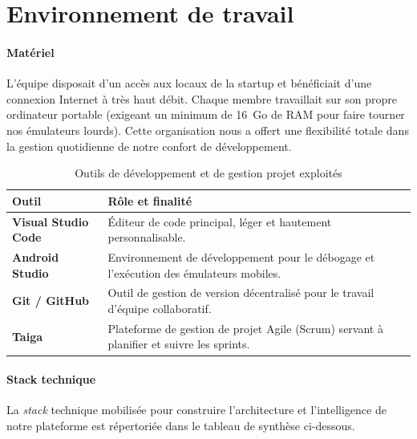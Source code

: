 \section{Environnement de travail}

\paragraph*{Matériel}
L'équipe disposait d'un accès aux locaux de la startup et bénéficiait d'une connexion Internet à très haut débit. Chaque membre travaillait sur son propre ordinateur portable (exigeant un minimum de 16~Go de RAM pour faire tourner nos émulateurs lourds). Cette organisation nous a offert une flexibilité totale dans la gestion quotidienne de notre confort de développement.

\begin{table}[H]
    \centering
    \small
    \renewcommand{\arraystretch}{1.5}
    \begin{tabular}{|l|p{10cm}|}
        \hline
        \rowcolor{headergray}
        \textbf{Outil} & \textbf{Rôle et finalité} \\ \hline
        \textbf{Visual Studio Code} & Éditeur de code principal, léger et hautement personnalisable. \\ \hline
        \textbf{Android Studio} & Environnement de développement pour le débogage et l'exécution des émulateurs mobiles. \\ \hline
        \textbf{Git / GitHub} & Outil de gestion de version décentralisé pour le travail d'équipe collaboratif. \\ \hline
        \textbf{Taiga} & Plateforme de gestion de projet Agile (Scrum) servant à planifier et suivre les sprints. \\ \hline
    \end{tabular}
    \caption{Outils de développement et de gestion projet exploités}
    \label{tab:outils_developpement}
\end{table}

\paragraph*{Stack technique}
La \emph{stack} technique mobilisée pour construire l'architecture et l'intelligence de notre plateforme est répertoriée dans le tableau de synthèse ci-dessous.

